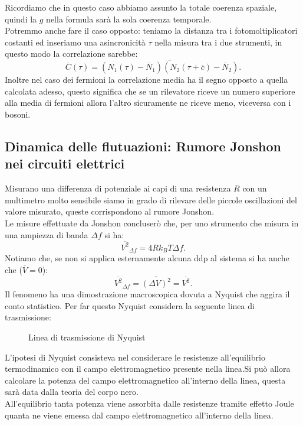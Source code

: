 Ricordiamo che in questo caso abbiamo assunto la totale coerenza spaziale, quindi la $g$ nella formula sarà la sola coerenza temporale. \\
Potremmo anche fare il caso opposto: teniamo la distanza tra i fotomoltiplicatori costanti ed inseriamo una asincronicità $\tau $ nella misura tra i due strumenti, in questo modo la correlazione sarebbe:
\[
	\overline{C}( \tau ) = 
	\overline{\left( N_1(\tau ) - \overline{N}_1 \right)
	\left( N_2( \tau + \overline{c}) - \overline{N}_2 \right) }
.\] 
Inoltre nel caso dei fermioni la correlazione media ha il segno opposto a quella calcolata adesso, questo significa che se un rilevatore riceve un numero superiore alla media di fermioni allora l'altro sicuramente ne riceve meno, viceversa con i bosoni.
\subsection{Dinamica delle flutuazioni: Rumore Jonshon nei circuiti elettrici}
\label{subsec:Dinamica delle flutuazioni: Rumore Jonshon nei circuiti elettrici}
Misurano una differenza di potenziale ai capi di una resistenza $R$ con un multimetro molto sensibile siamo in grado di rilevare delle piccole oscillazioni del valore misurato, queste corrispondono al rumore Jonshon.\\
Le misure effettuate da Jonshon concluserò che, per uno strumento che misura in una ampiezza di banda $\Delta f$ si ha:
\[
	\overline{V^2}_{\Delta f} 
	=
	4Rk_BT\Delta f
.\] 
Notiamo che, se non si applica esternamente alcuna ddp al sistema si ha anche che ($\overline{V}=0$):
\[
	\overline{V^2}_{\Delta f}
	= 
	\overline{\left( \Delta V \right) ^2}
	=
	\overline{V^2}
.\] 
Il fenomeno ha una dimostrazione macroscopica dovuta a Nyquist che aggira il conto statistico. Per far questo Nyquist considera la seguente linea di trasmissione:
\begin{figure}[H]
    \centering
    \caption{Linea di trasmissione di Nyquist}
    \label{fig:linea-di-trasmissione-di-nyquist}
\end{figure}
\noindent
L'ipotesi di Nyquist consisteva nel considerare le resistenze all'equilibrio termodinamico con il campo elettromagnetico presente nella linea.Si può allora calcolare la potenza del campo elettromagnetico all'interno della linea, questa sarà data dalla teoria del corpo nero. \\
All'equilibrio tanta potenza viene assorbita dalle resistenze tramite effetto Joule quanta ne viene emessa dal campo elettromagnetico all'interno della linea. 
